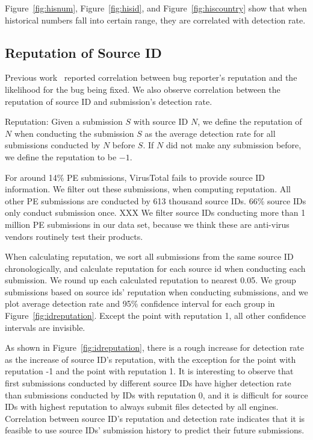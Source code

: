 Figure~\ref{fig:hisnum}, Figure~\ref{fig:hisid}, and Figure~\ref{fig:hiscountry} show that 
when historical numbers fall into certain range, they are correlated with detection rate. 
\fi

\subsection{Reputation of Source ID}
\label{sec:reputation}


Previous work~\cite{GuoICSE2010} reported correlation between bug reporter’s reputation and the likelihood for the bug being fixed. 
We also observe correlation between the reputation of source ID and submission’s detection rate. 

\begin{definition}{Reputation:}
Given a submission $S$ with source ID $N$, 
we define the reputation of $N$ when conducting the submission $S$ as the average detection rate for all submissions conducted by $N$ before $S$. 
If $N$ did not make any submission before, we define the reputation to be $-1$. 
\end{definition}

For around 14\% PE submissions, VirusTotal fails to provide source ID information. 
We filter out these submissions, when computing reputation.
All other PE submissions are conducted by 613 thousand source IDs. 
66\% source IDs only conduct submission once. 
XXX
We filter source IDs conducting more than 1 million PE submissions in our data set, 
because we think these are anti-virus vendors routinely test their products. 

When calculating reputation, we sort all submissions from the same source ID chronologically, 
and calculate reputation for each source id when conducting each submission. 
We round up each calculated reputation to nearest 0.05. 
We group submissions based on source ids' reputation when conducting submissions, 
and we plot average detection rate and 95\% confidence interval for each group in Figure~\ref{fig:idreputation}. 
Except the point with reputation 1, all other confidence intervals are invisible.  

As shown in Figure~\ref{fig:idreputation}, 
there is a rough increase for detection rate as the increase of source ID's reputation, 
with the exception for the point with reputation -1 and the point with reputation 1. 
It is interesting to observe that first submissions conducted by different source IDs have higher 
detection rate than submissions conducted by IDs with reputation 0, 
and it is difficult for source IDs with highest reputation to always submit files detected by all engines. 
Correlation between source ID's reputation and detection rate indicates 
that it is feasible to use source IDs' submission history to predict their future submissions.

